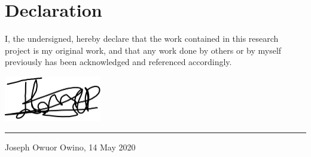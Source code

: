 \vfill
\section*{Declaration}
I, the undersigned, hereby declare that the work contained in this research project is my original work, and that any work done by others or by myself previously has been acknowledged and referenced accordingly.

\includegraphics[height=2cm]{images/signature.png} \newline \hrule
Joseph Owuor Owino, 14 May 2020

